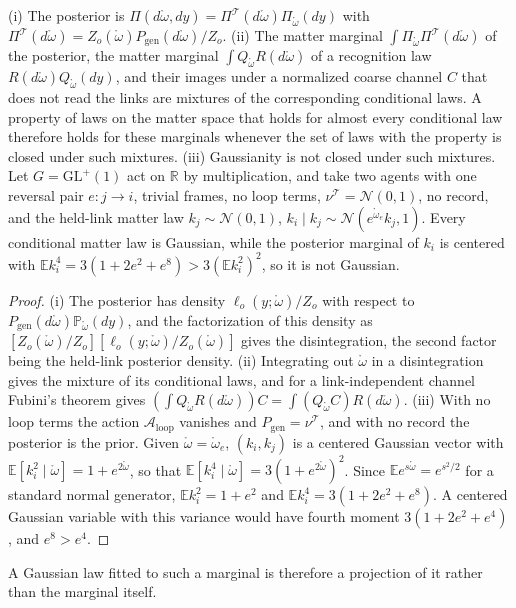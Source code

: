\begin{proposition}\label{prop:sp_link_transfer}
(i) The posterior is $\Pi(d\mathring\omega,dy)=\Pi^{\mathcal T}(d\mathring\omega)\Pi_{\mathring\omega}(dy)$ with $\Pi^{\mathcal T}(d\mathring\omega)=Z_o(\mathring\omega)P_{\mathrm{gen}}(d\mathring\omega)/Z_o$.
(ii) The matter marginal $\int\Pi_{\mathring\omega}\Pi^{\mathcal T}(d\mathring\omega)$ of the posterior, the matter marginal $\int Q_{\mathring\omega}R(d\mathring\omega)$ of a recognition law $R(d\mathring\omega)Q_{\mathring\omega}(dy)$, and their images under a normalized coarse channel $C$ that does not read the links are mixtures of the corresponding conditional laws. A property of laws on the matter space that holds for almost every conditional law therefore holds for these marginals whenever the set of laws with the property is closed under such mixtures.
(iii) Gaussianity is not closed under such mixtures. Let $G=\mathrm{GL}^+(1)$ act on $\mathbb R$ by multiplication, and take two agents with one reversal pair $e:j\to i$, trivial frames, no loop terms, $\nu^{\mathcal T}=\mathcal N(0,1)$, no record, and the held-link matter law $k_j\sim\mathcal N(0,1)$, $k_i\mid k_j\sim\mathcal N(e^{\mathring\omega_e}k_j,1)$. Every conditional matter law is Gaussian, while the posterior marginal of $k_i$ is centered with $\mathbb Ek_i^4=3(1+2e^2+e^8)>3(\mathbb Ek_i^2)^2$, so it is not Gaussian.
\end{proposition}
\begin{proof}
(i) The posterior has density $\ell_o(y;\mathring\omega)/Z_o$ with respect to $P_{\mathrm{gen}}(d\mathring\omega)\mathbb P_{\mathring\omega}(dy)$, and the factorization of this density as $[Z_o(\mathring\omega)/Z_o][\ell_o(y;\mathring\omega)/Z_o(\mathring\omega)]$ gives the disintegration, the second factor being the held-link posterior density.
(ii) Integrating out $\mathring\omega$ in a disintegration gives the mixture of its conditional laws, and for a link-independent channel Fubini's theorem gives $(\int Q_{\mathring\omega}R(d\mathring\omega))C=\int(Q_{\mathring\omega}C)R(d\mathring\omega)$.
(iii) With no loop terms the action $\mathcal A_{\mathrm{loop}}$ vanishes and $P_{\mathrm{gen}}=\nu^{\mathcal T}$, and with no record the posterior is the prior. Given $\mathring\omega=\mathring\omega_e$, $(k_i,k_j)$ is a centered Gaussian vector with $\mathbb E[k_i^2\mid\mathring\omega]=1+e^{2\mathring\omega}$, so that $\mathbb E[k_i^4\mid\mathring\omega]=3(1+e^{2\mathring\omega})^2$. Since $\mathbb Ee^{s\mathring\omega}=e^{s^2/2}$ for a standard normal generator, $\mathbb Ek_i^2=1+e^2$ and $\mathbb Ek_i^4=3(1+2e^2+e^8)$. A centered Gaussian variable with this variance would have fourth moment $3(1+2e^2+e^4)$, and $e^8>e^4$.
\end{proof}
A Gaussian law fitted to such a marginal is therefore a projection of it rather than the marginal itself.

